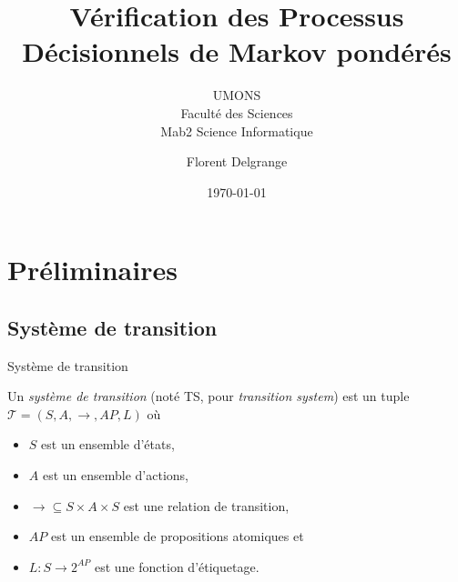 \documentclass[compress]{beamer}
\title{Vérification des Processus Décisionnels de Markov pondérés
} %
\author{Florent Delgrange}
\subtitle{\normalsize UMONS \\ Faculté des Sciences \\ Mab2 Science Informatique}
\date{\today}
\begin{document}
  \begin{frame}[plain]
    \maketitle
  \end{frame}


\section{Préliminaires}
\subsection{Système de transition}
\begin{frame}{Système de transition}
\begin{definition}
Un \textit{système de transition} (noté TS, pour \textit{transition system}) est un tuple $\mathcal{T} = (S, A, \rightarrow, AP, L)$ où
\begin{itemize}
  \item $S$ est un ensemble d'états,
  \item $A$ est un ensemble d'actions,
  \item $\rightarrow \subseteq S \times A \times S$ est une relation de transition,
  \item $AP$ est un ensemble de propositions atomiques et
  \item $L: S \rightarrow 2^{AP}$ est une fonction d'étiquetage.
\end{itemize}
\end{definition}
\end{frame}
\end{document}
